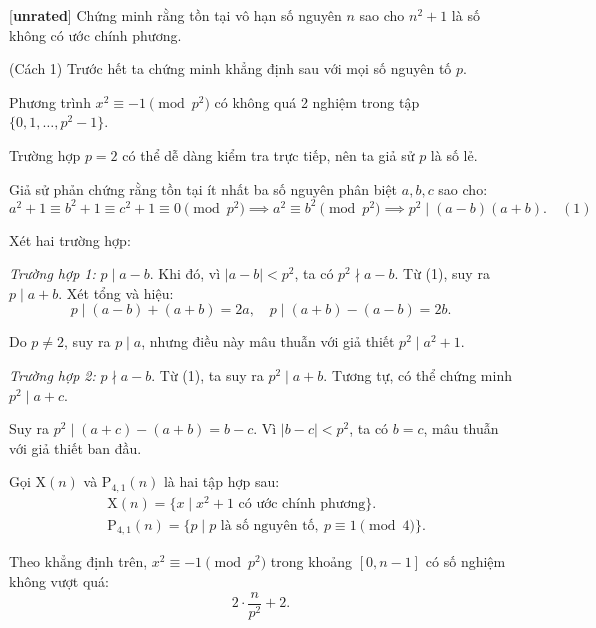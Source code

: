 \documentclass[../08-quadratic-residues.tex]{subfiles}
\begin{document}
\begin{example*}\label{example:CHN-2015-TST2-D2-P3}[\textbf{unrated}]
	Chứng minh rằng tồn tại vô hạn số nguyên \( n \) sao cho \( n^2 + 1 \) là số không có ước chính phương.
\end{example*}

\begin{soln}(Cách 1)\footnotemark
	Trước hết ta chứng minh khẳng định sau với mọi số nguyên tố \( p \).
	\begin{claim*}
		Phương trình $x^2 \equiv -1 \pmod{p^2}$ có không quá 2 nghiệm trong tập \( \{0,1,\dots,p^2-1\} \).
	\end{claim*}
	
	\begin{subproof}
		Trường hợp \( p = 2 \) có thể dễ dàng kiểm tra trực tiếp, nên ta giả sử \( p \) là số lẻ.
	
		Giả sử phản chứng rằng tồn tại ít nhất ba số nguyên phân biệt \( a, b, c \) sao cho:
		\[
			a^2 + 1 \equiv b^2 + 1 \equiv c^2 + 1 \equiv 0 \pmod{p^2} \implies a^2 \equiv b^2 \pmod{p^2} \implies p^2 \mid (a-b)(a+b). \quad (1)
		\]
		
		Xét hai trường hợp:
		
		\textit{Trường hợp 1:} \( p \mid a - b \). Khi đó, vì \( |a-b| < p^2 \), ta có \( p^2 \nmid a - b \). Từ (1), suy ra \( p \mid a + b \).  
		Xét tổng và hiệu:
		\[
			  p \mid (a-b) + (a+b) = 2a, \quad p \mid (a+b) - (a-b) = 2b.
		\]

		Do \( p \neq 2 \), suy ra \( p \mid a \), nhưng điều này mâu thuẫn với giả thiết \( p^2 \mid a^2 + 1 \).
	
		\textit{Trường hợp 2:} \( p \nmid a - b \). Từ (1), ta suy ra \( p^2 \mid a + b \). Tương tự, có thể chứng minh \( p^2 \mid a + c \).

		Suy ra \( p^2 \mid (a+c) - (a+b) = b - c \). Vì \( |b - c| < p^2 \), ta có \( b = c \), mâu thuẫn với giả thiết ban đầu.
	\end{subproof}
	
	Gọi \( \text{X}(n) \) và \( \text{P}_{4,1}(n) \) là hai tập hợp sau:
	\[
		\begin{aligned}
			&\text{X}(n) = \{ x \mid x^2 + 1 \text{ có ước chính phương} \}.\\
			&\text{P}_{4,1}(n) = \{ p \mid p \text{ là số nguyên tố},\ p \equiv 1 \pmod{4} \}.
		\end{aligned}
	\]

	Theo khẳng định trên, $x^2 \equiv -1 \pmod{p^2}$ trong khoảng \( [0, n-1] \) có số nghiệm không vượt quá:
	\[
		2 \cdot \frac{n}{p^2} + 2.
	\]
	

\end{soln}
\end{document}
